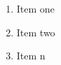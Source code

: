 \documentclass{beamer}
\newcommand{\mysquare}[1]{
  \hbox{%
    \usebeamerfont*{item projected}%
    \usebeamercolor[bg]{item projected}%
    \vrule width2.25ex height1.85ex depth.4ex%
    \hskip-2.25ex%
    \hbox to2.25ex{%
      \hfil%
      \color{fg}#1%
      \hfil}%
  }%
}
\begin{document}
    \begin{frame}
        \begin{enumerate}
            \item Item one
            \item Item two
            \item[\mysquare{n}] Item n
        \end{enumerate}
    \end{frame}
\end{document}
